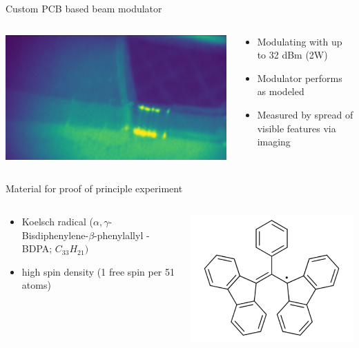 \documentclass[final]{beamer}
\begin{document}
\begin{frame}[fragile]{}
\begin{columns}[T]
\begin{column}{.49\linewidth}
\begin{block}{\Large Custom PCB based beam modulator}
\begin{columns}
\begin{column}{0.45\columnwidth}
				\includegraphics[width=0.49\columnwidth]{./figures/kickertest02.png}
			\end{column}
			\begin{column}{0.45\columnwidth}
				\begin{itemize}
					\item Modulating with up to 32 dBm (2W)
					\item Modulator performs as modeled
					\item Measured by spread of visible features via imaging
				\end{itemize}
			\end{column}
		\end{columns}
	\end{block}

	\begin{block}{\Large Material for proof of principle experiment}
		\begin{columns}
			\begin{column}{0.70\columnwidth}
				\begin{itemize}
					\item Koelsch radical ($\alpha,\gamma$-Bisdiphenylene-$\beta$-phenylallyl - BDPA; $C_{33}H_{21})$
					\item high spin density (1 free spin per 51 atoms)
				\end{itemize}
			\end{column}
			\begin{column}{0.20\columnwidth}
				\includegraphics[width=\columnwidth]{./figures/bdpa.png}	
			\end{column}
		\end{columns}
	\end{block}



\end{column}
\end{columns}
\end{frame}
\end{document}
